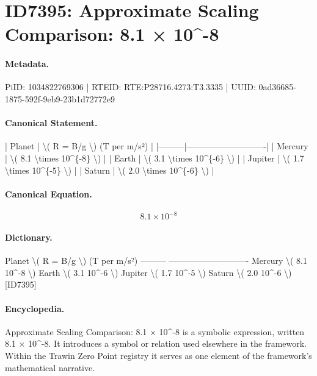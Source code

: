 \section*{ID7395: Approximate Scaling Comparison: 8.1 × 10\textasciicircum{}-8}
\paragraph{Metadata.}
PiID: 1034822769306 | RTEID: RTE:P28716.4273:T3.3335 | UUID: 0ad36685-1875-592f-9eb9-23b1d72772e9

\paragraph{Canonical Statement.}
| Planet | \textbackslash{}( R = B/g \textbackslash{}) (T per m/s²) | |---------|----------------------------| | Mercury | \textbackslash{}( 8.1 \textbackslash{}times 10\textasciicircum{}\{-8\} \textbackslash{}) | | Earth | \textbackslash{}( 3.1 \textbackslash{}times 10\textasciicircum{}\{-6\} \textbackslash{}) | | Jupiter | \textbackslash{}( 1.7 \textbackslash{}times 10\textasciicircum{}\{-5\} \textbackslash{}) | | Saturn | \textbackslash{}( 2.0 \textbackslash{}times 10\textasciicircum{}\{-6\} \textbackslash{}) |

\paragraph{Canonical Equation.}
\[
8.1 \times 10^{-8}
\]

\paragraph{Dictionary.}
Planet \textbackslash{}( R = B/g \textbackslash{}) (T per m/s²) --------- ---------------------------- Mercury \textbackslash{}( 8.1 10\textasciicircum{}-8 \textbackslash{}) Earth \textbackslash{}( 3.1 10\textasciicircum{}-6 \textbackslash{}) Jupiter \textbackslash{}( 1.7 10\textasciicircum{}-5 \textbackslash{}) Saturn \textbackslash{}( 2.0 10\textasciicircum{}-6 \textbackslash{}) [ID7395]

\paragraph{Encyclopedia.}
Approximate Scaling Comparison: 8.1 × 10\textasciicircum{}-8 is a symbolic expression, written 8.1 × 10\textasciicircum{}-8. It introduces a symbol or relation used elsewhere in the framework. Within the Trawin Zero Point registry it serves as one element of the framework's mathematical narrative.
